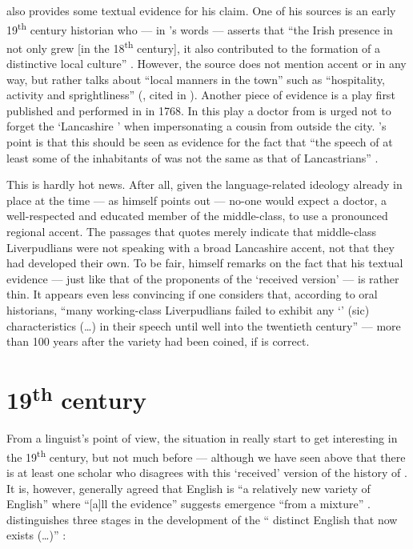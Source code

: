\textcite{crowley2012} also provides some textual evidence for his claim. One of his sources is an early 19\textsuperscript{th} century historian who --- in \citeauthor{crowley2012}'s words --- asserts that ``the Irish presence in  not only grew [in the 18\textsuperscript{th} century], it also contributed to the formation of a distinctive local culture'' \citeyearpar[30]{crowley2012}.
However, the source does not mention accent or  in any way, but rather talks about ``local manners in the town'' such as ``hospitality, activity and sprightliness'' (\citealt{troughton1810}, cited in \citealt[30]{crowley2012}).
Another piece of evidence is a play first published and performed in  in 1768.
In this play a doctor from  is urged not to forget the `Lancashire ' when impersonating a cousin from outside the city.
\citeauthor{crowley2012}'s point is that this should be seen as evidence for the fact that ``the speech of at least some of the inhabitants of  was not the same as that of Lancastrians'' \parencite[cf.][32--35]{crowley2012}.

This is hardly hot news.
After all, given the language-related ideology already in place at the time --- as \citeauthor{crowley2012} himself points out \citeyearpar[23]{crowley2012} --- no-one would expect a doctor, a well-respected and educated member of the middle-class, to use a pronounced regional accent.
The passages that \citeauthor{crowley2012} quotes merely indicate that middle-class Liverpudlians were not speaking with a broad Lancashire accent, not that they had developed their own.
To be fair, \citeauthor{crowley2012} himself remarks on the fact that his textual evidence --- just like that of the proponents of the `received version' --- is rather thin.
It appears even less convincing if one considers that, according to oral historians, ``many working-class Liverpudlians failed to exhibit any `' (sic) characteristics (\ldots) in their speech until well into the twentieth century''  \citep[43--44]{belchem2006d} --- more than 100 years after the variety had been coined, if \citeauthor{crowley2012} is correct.


	\section{19\textsuperscript{th} century}\label{sec.hist.19}

From a linguist's point of view, the situation in  really start to get interesting in the 19\textsuperscript{th} century, but not much before --- although we have seen above that there is at least one scholar who disagrees with this `received' version of the history of .
It is, however, generally agreed that  English is ``a relatively new variety of English'' where ``[a]ll the evidence'' suggests emergence ``from a  mixture'' \citep[113 and 121]{honeybone2007}.
\citeauthor{honeybone2007} distinguishes three stages in the development of the `` distinct  English that now exists (\dots)'' \citeyearpar[119]{honeybone2007}:

